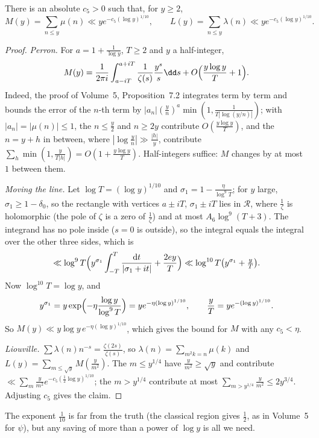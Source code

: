 \begin{proposition}\label{prop:liouville}
There is an absolute $c_5>0$ such that, for $y\ge2$,
\[
M(y)=\sum_{n\le y}\mu(n)\ll ye^{-c_5(\log y)^{1/10}},\qquad L(y)=\sum_{n\le y}\lambda(n)\ll ye^{-c_5(\log y)^{1/10}}.
\]
\end{proposition}
\begin{proof}
\emph{Perron.} For $a=1+\frac1{\log y}$, $T\ge2$ and $y$ a half-integer,
\[
M(y)=\frac1{2\pi i}\int_{a-iT}^{a+iT}\frac1{\zeta(s)}\frac{y^s}s\dd s+O\Bigl(\frac{y\log y}T+1\Bigr).
\]
Indeed, the proof of Volume~5, Proposition~7.2 integrates term by term and bounds the error of the $n$-th term by $|a_n|(\frac yn)^a\min(1,\frac1{T|\log(y/n)|})$; with $|a_n|=|\mu(n)|\le1$, the $n\le\frac y2$ and $n\ge2y$ contribute $O(\frac{y\log y}T)$, and the $n=y+h$ in between, where $|\log\frac yn|\gg\frac{|h|}y$, contribute $\sum_h\min(1,\frac y{T|h|})=O(1+\frac{y\log y}T)$. Half-integers suffice: $M$ changes by at most $1$ between them.

\emph{Moving the line.} Let $\log T=(\log y)^{1/10}$ and $\sigma_1=1-\frac\eta{\log^9T}$; for $y$ large, $\sigma_1\ge1-\delta_0$, so the rectangle with vertices $a\pm iT$, $\sigma_1\pm iT$ lies in $\mathcal R$, where $\frac1\zeta$ is holomorphic (the pole of $\zeta$ is a zero of $\frac1\zeta$) and at most $A_6\log^9(T+3)$. The integrand has no pole inside ($s=0$ is outside), so the integral equals the integral over the other three sides, which is
\[
\ll\log^9T\Bigl(y^{\sigma_1}\int_{-T}^T\frac{\mathrm dt}{|\sigma_1+it|}+\frac{2ey}T\Bigr)\ll\log^{10}T\bigl(y^{\sigma_1}+\tfrac yT\bigr).
\]
Now $\log^{10}T=\log y$, and
\[
y^{\sigma_1}=y\exp\Bigl(-\eta\frac{\log y}{\log^9T}\Bigr)=ye^{-\eta(\log y)^{1/10}},\qquad\frac yT=ye^{-(\log y)^{1/10}}.
\] So $M(y)\ll y\log y\,e^{-\eta(\log y)^{1/10}}$, which gives the bound for $M$ with any $c_5<\eta$.

\emph{Liouville.} $\sum\lambda(n)n^{-s}=\frac{\zeta(2s)}{\zeta(s)}$, so $\lambda(n)=\sum_{m^2k=n}\mu(k)$ and $L(y)=\sum_{m\le\sqrt y}M(\frac y{m^2})$. The $m\le y^{1/4}$ have $\frac y{m^2}\ge\sqrt y$ and contribute $\ll\sum_m\frac y{m^2}e^{-c_5(\frac12\log y)^{1/10}}$; the $m>y^{1/4}$ contribute at most $\sum_{m>y^{1/4}}\frac y{m^2}\le2y^{3/4}$. Adjusting $c_5$ gives the claim.
\end{proof}

The exponent $\frac1{10}$ is far from the truth (the classical region gives $\frac12$, as in Volume~5 for $\psi$), but any saving of more than a power of $\log y$ is all we need.

